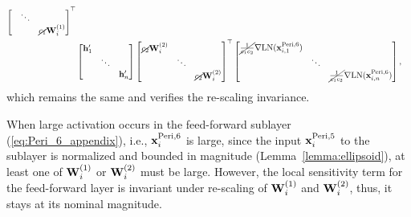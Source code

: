 \documentclass[journal]{IEEEtran}
\newcommand{\bfW}{{\bf W}}
\newcommand{\bfh}{{\bf h}}
\newcommand{\bfx}{{\bf x}}
\theoremstyle{plain}
\theoremstyle{definition}
\theoremstyle{remark}
\begin{document}
\begin{align}
\begin{bmatrix}
                 & \ddots &        \\
                 &        & \cancel{c_1}\bfW_{i}^{(1)}
\end{bmatrix}^\top \\
   & \begin{bmatrix}
\bfh'_1 &        &        \\
                 & \ddots &        \\
                 &        & \bfh'_n
\end{bmatrix}
\begin{bmatrix}
\cancel{c_2}\bfW_{i}^{(2)} &        &        \\
                 & \ddots &        \\
                 &        & \cancel{c_2}\bfW_{i}^{(2)}
\end{bmatrix}^\top \begin{bmatrix} \cancel{\frac{1}{c_1 c_2}}
\nabla {\rm LN}( \bfx^{{\rm Peri}, 6}_{i, 1}) &        &        \\
                 & \ddots &        \\
                 &        & \cancel{\frac{1}{c_1 c_2}} \nabla {\rm LN}(\bfx^{{\rm Peri}, 6}_{i, n})
\end{bmatrix},
\end{align}
which remains the same and verifies the re-scaling invariance.

When large activation occurs in the feed-forward sublayer (\ref{eq:Peri_6_appendix}), i.e., $\bfx^{\rm Peri, 6}_i$ is large, since the input $\bfx^{\rm Peri, 5}_i$  to the sublayer is normalized and bounded in magnitude (Lemma~\ref{lemma:ellipsoid}), at least one of $\bfW_{i}^{(1)}$ or $\bfW_{i}^{(2)}$ must be large. However, the local sensitivity term for the feed-forward layer is invariant under re-scaling of $\bfW_{i}^{(1)}$ and $\bfW_{i}^{(2)}$, thus, it stays at its nominal magnitude.
\end{document}
